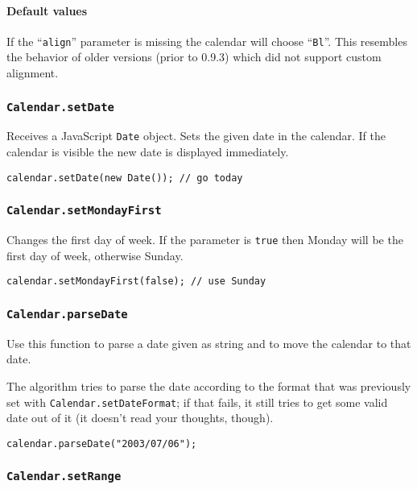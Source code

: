 \documentclass[a4paper,10pt]{article}
\begin{document}
\paragraph{Default values}
If the ``\texttt{align}'' parameter is missing the calendar will choose
``\texttt{Bl}''.  This resembles the behavior of older versions (prior to
0.9.3) which did not support custom alignment.

\subsubsection{\texttt{Calendar.setDate}}\label{sec:Calendar.setDate}

Receives a JavaScript \texttt{Date} object.  Sets the given date in the
calendar.  If the calendar is visible the new date is displayed immediately.

\begin{verbatim}
calendar.setDate(new Date()); // go today
\end{verbatim}

\subsubsection{\texttt{Calendar.setMondayFirst}}\label{sec:Calendar.setMondayFirst}

Changes the first day of week.  If the parameter is \texttt{true} then Monday
will be the first day of week, otherwise Sunday.

\begin{verbatim}
calendar.setMondayFirst(false); // use Sunday
\end{verbatim}

\subsubsection{\texttt{Calendar.parseDate}}\label{sec:Calendar.parseDate}

Use this function to parse a date given as string and to move the calendar to
that date.

The algorithm tries to parse the date according to the format that was
previously set with \texttt{Calendar.setDateFormat}; if that fails, it still
tries to get some valid date out of it (it doesn't read your thoughts, though).

\begin{verbatim}
calendar.parseDate("2003/07/06");
\end{verbatim}

\subsubsection{\texttt{Calendar.setRange}}\label{sec:Calendar.setRange}
\end{document}
